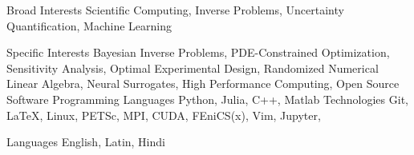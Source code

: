 

\begin{cvskills}

  \cvskill
    {Broad Interests} %
    {
      Scientific Computing, 
      Inverse Problems, 
      Uncertainty Quantification, 
      Machine Learning
    } %

  \cvskill
    {Specific Interests} %
    {
      Bayesian Inverse Problems,
      PDE-Constrained Optimization,
      Sensitivity Analysis,
      Optimal Experimental Design, \hspace{5em}
      Randomized Numerical Linear Algebra,
      Neural Surrogates,
      High Performance Computing,
      Open Source Software
    }
  \cvskill
    {Programming Languages} %
    {
      Python, Julia, C++, Matlab
    }
  \cvskill
    {Technologies} %
    {
      Git, \LaTeX, Linux, PETSc, MPI, CUDA, FEniCS(x), Vim, Jupyter,
    }

  \cvskill
    {Languages} %
    {English, Latin, Hindi} %

\end{cvskills}
